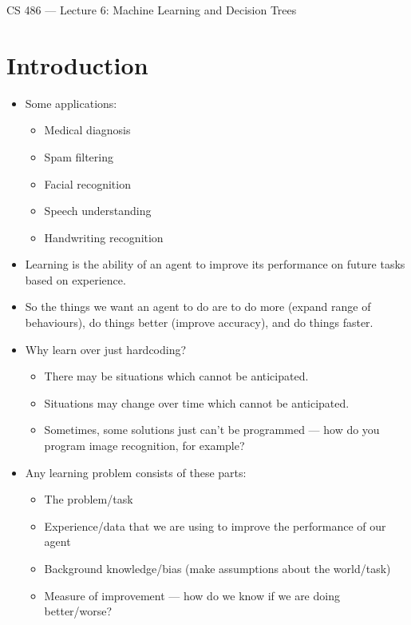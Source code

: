 \documentclass{article}
\author{Clement Tsang}
\begin{document}
\begin{center}
    \Large{CS 486 --- Lecture 6: Machine Learning and Decision Trees}
\end{center}

\section{Introduction}
\begin{itemize}
    \item Some applications:
        \begin{itemize}
            \item Medical diagnosis
            \item Spam filtering
            \item Facial recognition
            \item Speech understanding
            \item Handwriting recognition
        \end{itemize}
    \item Learning is the ability of an agent to improve its performance on future tasks based on experience.
    \item So the things we want an agent to do are to do more (expand range of behaviours), do things better (improve accuracy), and do things faster.
    \item Why learn over just hardcoding?
        \begin{itemize}
            \item There may be situations which cannot be anticipated.
            \item Situations may change over time which cannot be anticipated.
            \item Sometimes, some solutions just can't be programmed --- how do you program image recognition, for example?
        \end{itemize}
    \item Any learning problem consists of these parts:
        \begin{itemize}
            \item The problem/task
            \item Experience/data that we are using to improve the performance of our agent
            \item Background knowledge/bias (make assumptions about the world/task)
            \item Measure of improvement --- how do we know if we are doing better/worse?

\end{itemize}
\end{itemize}
\end{document}
